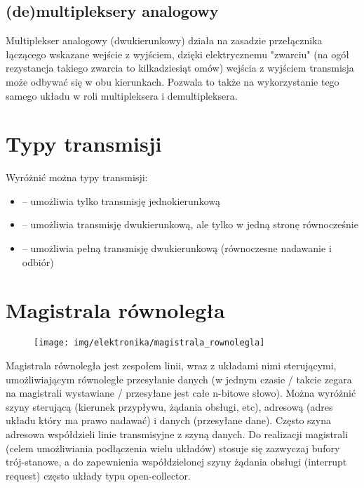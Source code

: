 \documentclass{pdfBooklets}
\begin{document}
\subsection{(de)multipleksery analogowy}

Multiplekser analogowy (dwukierunkowy) działa na zasadzie przełącznika łączącego wskazane wejście z wyjściem, dzięki elektrycznemu "zwarciu" (na ogół rezystancja takiego zwarcia to kilkadziesiąt omów) wejścia z wyjściem transmisja może odbywać się w obu kierunkach. Pozwala to także na wykorzystanie tego samego układu w roli multipleksera i demultipleksera.


\section{Typy transmisji}

Wyróżnić można typy transmisji:
\begin{itemize}
\item {} -- umożliwia tylko transmisję jednokierunkową
\item {} -- umożliwia transmisję dwukierunkową, ale tylko w jedną stronę równocześnie
\item {} -- umożliwia pełną transmisję dwukierunkową (równoczesne nadawanie i odbiór)
\end{itemize}

\section{Magistrala równoległa}

\begin{figure}\begin{center}
    \texttt{[image: img/elektronika/magistrala\_rownolegla]}
\end{center}\end{figure}
Magistrala równoległa jest zespołem linii, wraz z układami nimi sterującymi, umożliwiającym równoległe przesyłanie danych (w jednym czasie / takcie zegara na magistrali wystawiane / przesyłane jest całe n-bitowe słowo).
Można wyróżnić szyny sterującą (kierunek przypływu, żądania obsługi, etc), adresową (adres układu który ma prawo nadawać) i danych (przesyłane dane). Często szyna adresowa współdzieli linie transmisyjne z szyną danych.
Do realizacji magistrali (celem umożliwiania podłączenia wielu układów) stosuje się zazwyczaj bufory trój-stanowe, a do zapewnienia współdzielonej szyny żądania obsługi (interrupt request) często układy typu open-collector.
\end{document}
